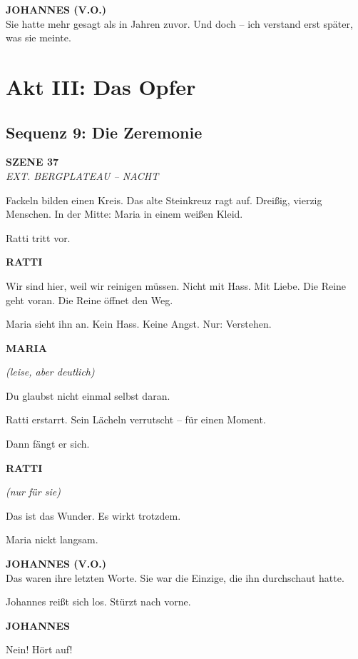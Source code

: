 \documentclass[11pt,a4paper,twoside]{book}
\newcommand{\szene}[2]{%
    \vspace{1em}
    \noindent\textbf{\textsf{#1}}\\
    \textit{#2}
    \vspace{0.5em}
}
\newcommand{\figur}[1]{%
    \vspace{0.5em}
    \noindent\hspace{3cm}\textbf{\MakeUppercase{#1}}\\
    \hspace{3cm}
}
\newcommand{\regieanweisung}[1]{%
    \textit{(#1)}
}
\newcommand{\voiceover}[1]{%
    \begin{voiceoverbox}
    \textbf{JOHANNES (V.O.)}\\
    #1
    \end{voiceoverbox}
}
\begin{document}
\voiceover{Sie hatte mehr gesagt als in Jahren zuvor. Und doch -- ich verstand erst später, was sie meinte.}


\chapter{Akt III: Das Opfer}

\section*{Sequenz 9: Die Zeremonie}

\szene{SZENE 37}{EXT. BERGPLATEAU -- NACHT}

Fackeln bilden einen Kreis. Das alte Steinkreuz ragt auf. Dreißig, vierzig Menschen. In der Mitte: Maria in einem weißen Kleid.

Ratti tritt vor.

\begin{dialogbox}
\figur{Ratti}
Wir sind hier, weil wir reinigen müssen. Nicht mit Hass. Mit Liebe. Die Reine geht voran. Die Reine öffnet den Weg.
\end{dialogbox}

Maria sieht ihn an. Kein Hass. Keine Angst. Nur: Verstehen.

\begin{dialogbox}
\figur{Maria}
\regieanweisung{leise, aber deutlich}
Du glaubst nicht einmal selbst daran.
\end{dialogbox}

Ratti erstarrt. Sein Lächeln verrutscht -- für einen Moment.

Dann fängt er sich.

\begin{dialogbox}
\figur{Ratti}
\regieanweisung{nur für sie}
Das ist das Wunder. Es wirkt trotzdem.
\end{dialogbox}

Maria nickt langsam.

\voiceover{Das waren ihre letzten Worte. Sie war die Einzige, die ihn durchschaut hatte.}

Johannes reißt sich los. Stürzt nach vorne.

\begin{dialogbox}
\figur{Johannes}
Nein! Hört auf!
\end{dialogbox}
\end{document}

